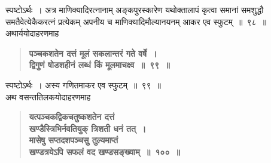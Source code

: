 \documentclass[11pt, openany]{book}
\begin{document}
\begin{sloppypar}
स्पष्टोऽर्थः~। अत्र माणिक्यादिरत्नानाम् अङ्कपुरस्कारेण यथोक्तालापं कृत्वा समानां समशुद्धौ समतैवेत्येकैकरत्नं प्रत्येकम् अपनीय च माणिक्यादिमौल्यानयनम् आकर एव स्फुटम्~॥~९८~॥\\

{\small अथार्ययोदाहरणमाह\textendash }

 \label{7.99}
\begin{quote}
{\large \textbf{{\color{purple}पञ्चकशतेन दत्तं मूलं सकलान्तरं गते वर्षे~।\\
द्विगुणं षोडशहीनं लब्धं किं मूलमाचक्ष्व~॥~९९~॥}}}
\end{quote}

\end{sloppypar}

\newpage

\begin{sloppypar}
स्पष्टोऽर्थः~। अस्य गणितमाकर एव स्फुटम्~॥~९९~॥\\

{\small अथ वसन्ततिलकयोदाहरणमाह\textendash }

 \label{7.100}
\begin{quote}
{\large \textbf{{\color{purple}यत्पञ्चकद्विकचतुष्कशतेन दत्तं \\
खण्डैस्त्रिभिर्नवतियुक् त्रिशती धनं तत्~।\\
मासेषु सप्तदशपञ्चसु तुल्यमाप्तं \\
खण्डत्रयेऽपि सफलं वद खण्डसङ्ख्याम्~॥~१००~॥}}}
\end{quote}


\end{sloppypar}
\end{document}
